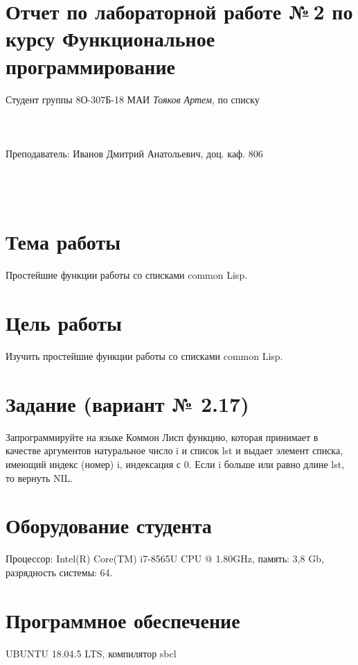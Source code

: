 \documentclass[12pt]{article}
\begin{document}
\section*{Отчет по лабораторной работе №\,2 
по курсу \guillemotleft  Функциональное программирование\guillemotright}
\begin{flushright}
Студент группы 8О-307Б-18 МАИ \textit{Тояков Артем},  по списку \\
 \\
 \\
\ \\
Преподаватель: Иванов Дмитрий Анатольевич, доц. каф. 806 \\
 \\
 \\
 \\

\end{flushright}

\section{Тема работы}
Простейшие функции работы со списками common Lisp.

\section{Цель работы}
Изучить  простейшие функции работы со списками common Lisp.

\section{Задание (вариант № 2.17)}
Запрограммируйте на языке Коммон Лисп функцию, которая принимает в качестве аргументов натуральное число i и список lst и выдает элемент списка, имеющий индекс (номер) i, индексация с 0. Если i больше или равно длине lst, то вернуть NIL.

\section{Оборудование студента}
Процессор: Intel(R) Core(TM) i7-8565U CPU @ 1.80GHz, память: 3,8 Gb, разрядность системы: 64.

\section{Программное обеспечение}
UBUNTU 18.04.5 LTS, компилятор sbcl
\end{document}
